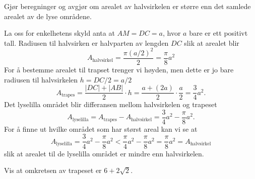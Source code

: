\begin{oppgaver}
   Gjør beregninger og avgjør om arealet av halvsirkelen er større enn
    det samlede arealet av de lyse områdene.
\end{oppgaver}

\begin{losninger}
  La oss for enkelhetens skyld anta at $AM = DC = a$, hvor $a$ bare er ett
  positivt tall. Radiusen til halvsirken er halvparten av lengden $DC$ slik
  at arealet blir
  \begin{equation*}
    A_{\text{halvsirkel}}
    = \frac{\pi (a/2)^2}{2}
    = \frac{\pi}{8} a^2
  \end{equation*}
  For å bestemme arealet til trapset trenger vi høyden, men dette er jo bare
  radiusen til halvsirkelen $h = DC/2 = a/2$
  \begin{equation*}
    A_{\text{trapes}}
    = \frac{|DC| + |AB|}{2} \cdot h
    = \frac{a + (2a)}{2} \cdot \frac{a}{2}
    = \frac{3}{4}a^2.
  \end{equation*}
  Det lyselilla området blir differansen mellom halvsirkelen og trapeset
  \begin{equation*}
    A_{\text{lyselilla}}
    = A_{\text{trapes}} - A_{\text{halvsirkel}}
    = \frac{3}{4}a^2 - \frac{\pi}{8} a^2.
  \end{equation*}
  For å finne ut hvilke området som har størst areal kan vi se at
  \begin{equation*}
    A_{\text{lyselilla}}
    = \frac{3}{4}a^2 - \frac{\pi}{8} a^2
    < \frac{\pi}{4}a^2 - \frac{\pi}{8} a^2
    = \frac{\pi}{8} a^2
    =  A_{\text{halvsirkel}}
  \end{equation*}
  slik at arealet til de lyselilla området er mindre enn halvsirkelen.
\end{losninger}

\begin{oppgaver}
   Vis at omkretsen av trapeset er $6 + 2\sqrt{2}$.
\end{oppgaver}

